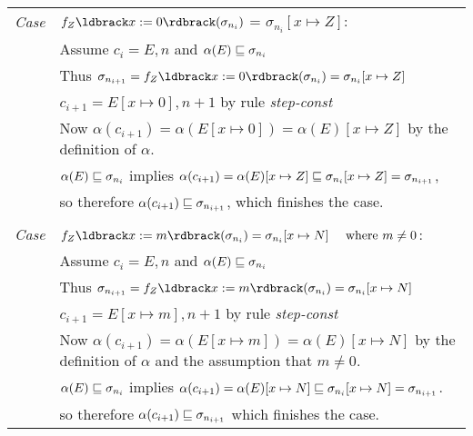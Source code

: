 \documentclass[11pt]{article}
\begin{document}
\begin{tabularx}{\textwidth}{lX}
\emph{Case} & $f_Z\parg{x := 0}(\sigma_{n_i}) $ = $\sigma_{n_i}[x \mapsto Z]$: \\
 & Assume $c_i = E,n$ and $\alpha(E) \sqsubseteq \sigma_{n_i}$ \\
 & Thus $\sigma_{n_{i+1}} = f_Z\parg{x := 0}(\sigma_{n_i}) = \sigma_{n_i}[x \mapsto Z]$ \\ 
 & $c_{i+1} = E[x \mapsto 0],n+1$ by rule \textit{step-const} \\
 & Now $\alpha(c_{i+1}) = \alpha(E[x \mapsto 0]) = \alpha(E)[x \mapsto Z]$ by the definition of $\alpha$. \\

 & $\alpha(E) \sqsubseteq \sigma_{n_i}$ implies $\alpha(c_{i+1}) = \alpha(E)[x \mapsto Z] \sqsubseteq \sigma_{n_i}[x \mapsto Z] = \sigma_{n_{i+1}}$, \\
 & so therefore $\alpha(c_{i+1}) \sqsubseteq \sigma_{n_{i+1}}$, which finishes the case.\\

\\
\emph{Case} & $f_Z\parg{x := m}(\sigma_{n_i}) = \sigma_{n_i}[x \mapsto N] ~~~~ \mbox{where}~ m \neq 0$: \\
 & Assume $c_i = E,n$ and $\alpha(E) \sqsubseteq \sigma_{n_i}$ \\
 & Thus $\sigma_{n_{i+1}} = f_Z\parg{x := m}(\sigma_{n_i}) = \sigma_{n_i}[x \mapsto N]$ \\
 &  $c_{i+1} = E[x \mapsto m],n+1$ by rule \textit{step-const} \\ 
 & Now $\alpha(c_{i+1}) = \alpha(E[x \mapsto m]) = \alpha(E)[x \mapsto N]$ by the definition of $\alpha$ and the assumption that $m \neq 0$. \\
 & $\alpha(E) \sqsubseteq \sigma_{n_i}$ implies $\alpha(c_{i+1}) = \alpha(E)[x \mapsto N] \sqsubseteq \sigma_{n_i}[x \mapsto N] = \sigma_{n_{i+1}}$. \\
 &  so therefore $\alpha(c_{i+1}) \sqsubseteq \sigma_{n_{i+1}}$ which finishes the case.\\

\end{tabularx}
\end{document}
